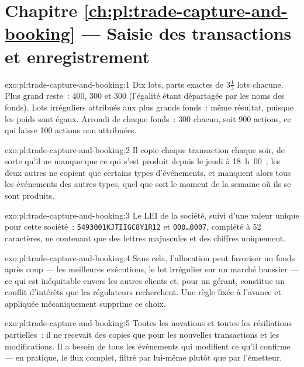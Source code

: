 \section*{Chapitre \ref{ch:pl:trade-capture-and-booking} --- Saisie des transactions et enregistrement}

\begin{solution}{exo:pl:trade-capture-and-booking:1}
Dix lots, parts exactes de $3\tfrac13$ lots chacune. Plus grand reste~: 400, 300 et 300 (l'égalité étant départagée par les noms des fonds). Lots irréguliers attribués aux
plus grands fonds~: même résultat, puisque les poids sont égaux. Arrondi de chaque fonds~: 300 chacun, soit 900 actions, ce qui laisse 100 actions non attribuées.
\end{solution}

\begin{solution}{exo:pl:trade-capture-and-booking:2}
Il copie chaque transaction chaque soir, de sorte qu'il ne manque que ce qui s'est produit depuis le jeudi à 18~h~00~; les deux autres ne copient que certains types d'événements,
et manquent alors tous les événements des autres types, quel que soit le moment de la semaine où ils se sont produits.
\end{solution}

\begin{solution}{exo:pl:trade-capture-and-booking:3}
Le LEI de la société, suivi d'une valeur unique pour cette société~: \texttt{5493001KJTIIGC8Y1R12} et \texttt{000\dots0007}, complété à 52 caractères,
ne contenant que des lettres majuscules et des chiffres uniquement.
\end{solution}

\begin{solution}{exo:pl:trade-capture-and-booking:4}
Sans cela, l'allocation peut favoriser un fonds après coup --- les meilleures exécutions, le lot irrégulier sur un marché haussier --- ce qui est inéquitable envers les
autres clients et, pour un gérant, constitue un conflit d'intérêts que les régulateurs recherchent. Une règle fixée à l'avance et appliquée mécaniquement supprime ce choix.
\end{solution}

\begin{solution}{exo:pl:trade-capture-and-booking:5}
Toutes les novations et toutes les résiliations partielles~: il ne recevait des copies que pour les nouvelles transactions et les modifications. Il a besoin de tous les événements qui modifient
ce qu'il confirme --- en pratique, le flux complet, filtré par lui-même plutôt que par l'émetteur.
\end{solution}

